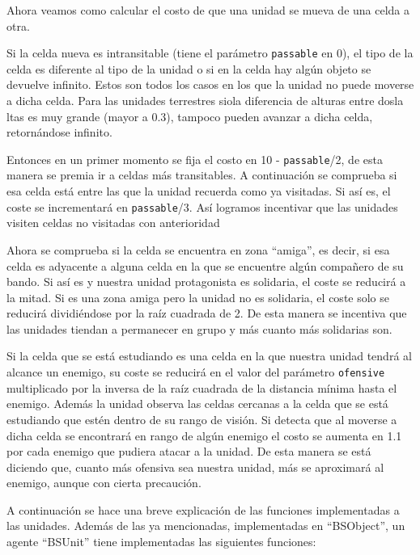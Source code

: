 Ahora veamos como calcular el costo de que una unidad se mueva de una celda a otra.
 
Si la celda nueva es intransitable (tiene el par\'ametro \verb|passable| en 0), el tipo de la celda es diferente al tipo de la unidad o si en la celda hay alg\'un objeto se devuelve infinito. Estos son todos los casos en los que la unidad no puede moverse a dicha celda. Para las unidades terrestres siola diferencia de alturas entre dosla ltas es muy grande (mayor a 0.3), tampoco pueden avanzar a dicha celda, retorn\'andose infinito. 
 
Entonces en un primer momento se fija el costo en 10 - \verb|passable|/2, de esta manera se premia ir a celdas m\'as transitables. A continuaci\'on se comprueba si esa celda est\'a entre las que la unidad recuerda como ya visitadas. Si as\'i es, el coste se incrementar\'a en \verb|passable|/3. As\'i logramos incentivar que las unidades visiten celdas no visitadas con anterioridad  
  
Ahora se comprueba si la celda se encuentra en zona ``amiga'', es decir, si esa celda es adyacente a alguna celda en la que se encuentre alg\'un compa\~{n}ero de su bando. Si as\'i es y nuestra unidad protagonista es solidaria, el coste se reducir\'a a la mitad. Si es una zona amiga pero la unidad no es solidaria, el coste solo se reducir\'a dividi\'endose por la ra\'iz cuadrada de 2. De esta manera se incentiva que las unidades tiendan a permanecer en grupo y m\'as cuanto m\'as solidarias son.

Si la celda que se est\'a estudiando es una celda en la que nuestra unidad tendr\'a al alcance un enemigo, su coste se reducir\'a en el valor del par\'ametro \verb|ofensive|  multiplicado por la inversa de la ra\'iz cuadrada de la distancia m\'inima hasta el enemigo. Adem\'as la unidad observa las celdas cercanas a la celda que se est\'a estudiando que est\'en dentro de su rango de visi\'on. Si detecta que al moverse a dicha celda se encontrar\'a en rango de alg\'un enemigo el costo se aumenta en 1.1 por cada enemigo que pudiera atacar a la unidad. De esta manera se est\'a diciendo que, cuanto m\'as ofensiva sea nuestra unidad, m\'as se aproximar\'a al enemigo, aunque con cierta precauci\'on.

A continuaci\'on se hace una breve explicaci\'on de las funciones implementadas a las unidades. Adem\'as de las   
ya mencionadas, implementadas en ``BSObject'', un agente ``BSUnit'' tiene implementadas las siguientes funciones:

